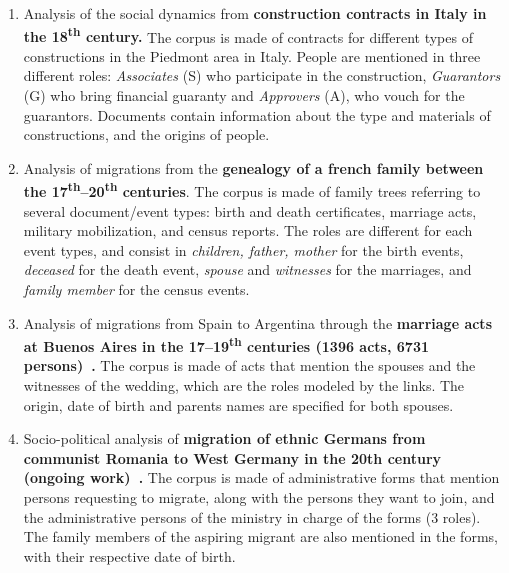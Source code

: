 \documentclass{vgtc}                          %
\newcommand{\ts}{\textsuperscript}
\begin{document}
\newcommand{\pascal}{\#1}
\newcommand{\nicole}{\#2}
\newcommand{\zacarias}{\#3}
\newcommand{\dana}{\#4}
\newcommand{\myindent}{~~} %
\begin{enumerate}[noitemsep]
    \item Analysis of the social dynamics from \textbf{construction contracts in Italy in the 18\ts{th} century\cite{Cristofoli2018}.} 
    The corpus is made of contracts for different types of constructions in the Piedmont area in Italy. People are mentioned in three different roles: \textit{Associates} (S) who participate in the construction, \textit{Guarantors} (G) who bring financial guaranty and \textit{Approvers} (A), who vouch for the guarantors. Documents contain information about the type and materials of constructions, and the origins of people.
    \item Analysis of migrations from the \textbf{genealogy of a french family between the 17\ts{th}--20\ts{th} centuries}.
    The corpus is made of family trees referring to several document/event types: birth and death certificates, marriage acts, military mobilization, and census reports. The roles are different for each event types, and consist in \textit{children, father, mother} for the birth events, \textit{deceased} for the death event, \textit{spouse} and \textit{witnesses} for the marriages, and \textit{family member} for the census events. 
    \item Analysis of migrations from Spain to Argentina through the \textbf{marriage acts at Buenos Aires in the 17--19\ts{th} centuries (1396 acts, 6731 persons)~\cite{moutoukias2016buenos}.}
    The corpus is made of acts that mention the spouses and the witnesses of the wedding, which are the roles modeled by the links. The origin, date of birth and parents names are specified for both spouses.
    \item Socio-political analysis of \textbf{migration of ethnic Germans from communist Romania to West Germany in the 20th century (ongoing work)~\cite{diminescu:hal-02556007}.}
    The corpus is made of administrative forms that mention persons requesting to migrate, along with the persons they want to join, and the administrative persons of the ministry in charge of the forms (3 roles).
    The family members of the aspiring migrant are also mentioned in the forms, with their respective date of birth.
\end{enumerate}
\end{document}
